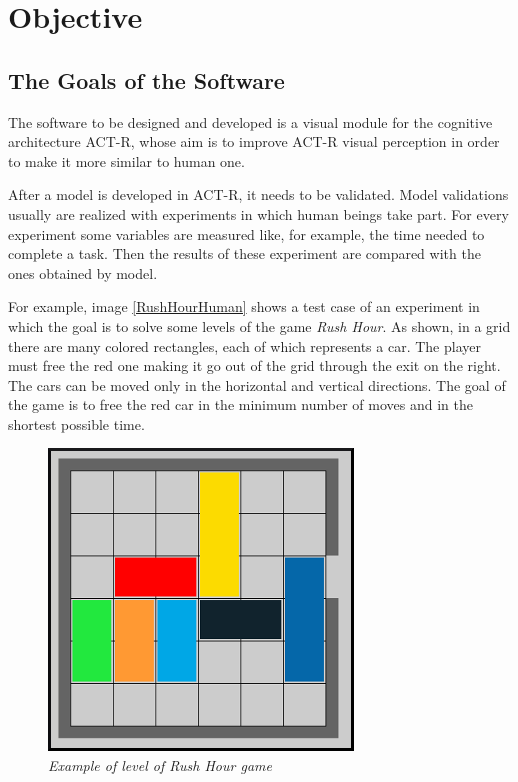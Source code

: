 \chapter{Objective}

	\section{The Goals of the Software}
	The software to be designed and developed is a visual module for the cognitive architecture ACT-R, whose aim is to improve ACT-R visual perception in order to make it more similar to human one. 
	
	After a model is developed in ACT-R, it needs to be validated. Model validations usually are realized with experiments in which human beings take part. For every experiment some variables are measured like, for example, the time needed to complete a task. Then the results of these experiment are compared with the ones obtained by model.
 
	For example, image \ref{RushHourHuman} shows a test case of an experiment in which the goal is to solve some levels of the game \emph{Rush Hour}. As shown, in a grid there are many colored rectangles, each of which represents a car. The player must free the red one making it go out of the grid through the exit on the right. The cars can be moved only in the horizontal and vertical directions. The goal of the game is to free the red car in the minimum number of moves and in the shortest possible time.

	\begin{figure}[h]
	  \begin{center} 
	    \includegraphics[scale=0.3]{images/ch_03/original.bmp}
	  \end{center} 
	  \caption{\textit{Example of level of Rush Hour game}}  
	  \label{fig:RushHourHuman}
  	\end{figure}
	

